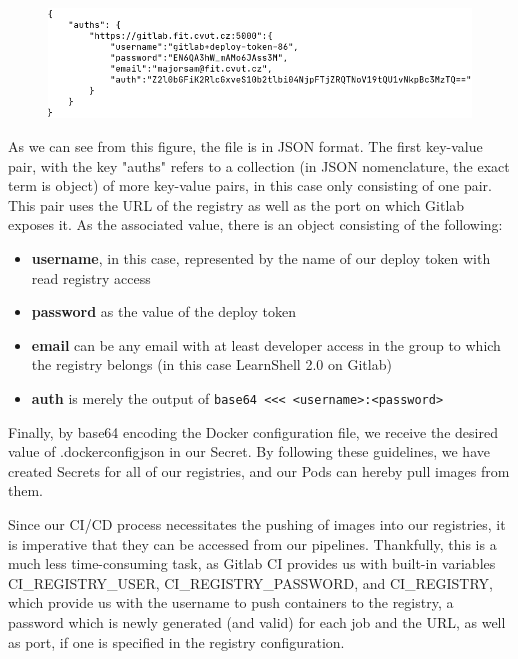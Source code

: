 \documentclass[thesis=B,english]{FITthesis}[2019/12/23]
\begin{document}
\begin{figure}[H]
\centering
\hspace*{-0.6cm}
\includegraphics[scale=0.5]{docker-config}
\end{figure}

As we can see from this figure, the file is in JSON format. The first key-value pair, with the key "auths" refers to a collection (in JSON nomenclature, the exact term is object) of more key-value pairs, in this case only consisting of one pair. This pair uses the URL of the registry as well as the port on which Gitlab exposes it. As the associated value, there is an object consisting of the following:

\begin{itemize}
  \setlength\itemsep{0em}
  \item \textbf{username}, in this case, represented by the name of our deploy token with read registry access
  \item \textbf{password} as the value of the deploy token
  \item \textbf{email} can be any email with at least developer access in the group to which the registry belongs (in this case LearnShell 2.0 on Gitlab)
  \item \textbf{auth} is merely the output of \verb|base64 <<< <username>:<password>|
\end{itemize}

Finally, by base64 encoding the Docker configuration file, we receive the desired value of .dockerconfigjson in our Secret. By following these guidelines, we have created Secrets for all of our registries, and our Pods can hereby pull images from them.

Since our CI/CD process necessitates the pushing of images into our registries, it is imperative that they can be accessed from our pipelines. Thankfully, this is a much less time-consuming task, as Gitlab CI provides us with built-in variables CI\_REGISTRY\_USER, CI\_REGISTRY\_PASSWORD, and CI\_REGISTRY, which provide us with the username to push containers to the registry, a password which is newly generated (and valid) for each job and the URL, as well as port, if one is specified in the registry configuration.
\end{document}
